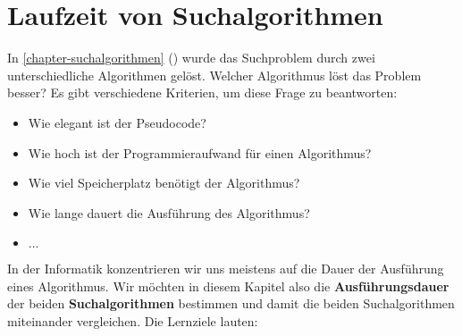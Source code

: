 
\toggletrue{image}
\toggletrue{imagehover}

\chapter{Laufzeit von Suchalgorithmen}
\label{chapter-laufzeit-suchalgorithmen}

In \autoref{chapter-suchalgorithmen} () wurde das Suchproblem durch zwei unterschiedliche Algorithmen gelöst. Welcher Algorithmus löst das Problem besser? Es gibt verschiedene Kriterien, um diese Frage zu beantworten:

\begin{itemize}
	\item Wie elegant ist der Pseudocode?
	\item Wie hoch ist der Programmieraufwand für einen Algorithmus?
	\item Wie viel Speicherplatz benötigt der Algorithmus?
	\item Wie lange dauert die Ausführung des Algorithmus?
	\item $\dots$
\end{itemize}

In der Informatik konzentrieren wir uns meistens auf die Dauer der Ausführung eines Algorithmus. Wir möchten in diesem Kapitel also die \textbf{Ausführungsdauer} der beiden \textbf{Suchalgorithmen} bestimmen und damit die beiden Suchalgorithmen miteinander vergleichen. Die Lernziele lauten:

\newcommand{\laufzeitSuchalgorithmenLernziele}{
\protect\begin{todolist}
\item Sie definieren den Begriff Laufzeit und erklären, warum wir diese Definition so gewählt hat.
\item Sie bestimmten die Laufzeit für einen Algorithmus mit einer gegebenen Eingabe.
\item Sie erklären, was wir unter der asymptotischen Laufzeit eines Algorithmus versteht.
\item Sie erklären die drei Varianten, die es für die Bestimmung der asymptotischen Laufzeit gibt.
\item Sie skizzieren die asymptotischen Laufzeiten in einem (kartesischen) Koordinatensystem.
\item Sie bestimmten für einen Algorithmus die asymptotische Worst-Case-Laufzeit.
\item Sie notieren für ein sortiertes Array den dazugehörigen binären Suchbaum.
\end{todolist}
} 

